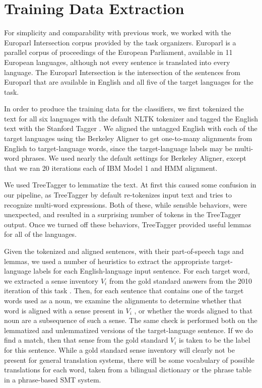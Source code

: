 \documentclass[11pt,letterpaper]{article}
\begin{document}
\section{Training Data Extraction}
\label{extraction}
For simplicity and comparability with previous work, we worked with the
Europarl Intersection corpus provided by the task organizers. Europarl
\cite{europarl} is a parallel corpus of proceedings of the European Parliament,
available in 11 European languages, although not every sentence is translated
into every language. The Europarl Intersection is the intersection of the
sentences from Europarl that are available in English and all five of the
target languages for the task.

In order to produce the training data for the classifiers, we first tokenized
the text for all six languages with the default NLTK tokenizer and tagged the
English text with the Stanford Tagger
\cite{Toutanova03feature-richpart-of-speech}. We aligned the untagged English
with each of the target languages using the Berkeley Aligner
\cite{denero-klein:2007:ACLMain} to get one-to-many alignments from English to
target-language words, since the target-language labels may be multi-word
phrases. We used nearly the default settings for Berkeley Aligner, except that
we ran 20 iterations each of IBM Model 1 and HMM alignment.

We used TreeTagger \cite{Schmid95improvementsin} to lemmatize the text. At
first this caused some confusion in our pipeline, as TreeTagger by default
re-tokenizes input text and tries to recognize multi-word expressions. Both of
these, while sensible behaviors, were unexpected, and resulted in a surprising 
number of tokens in the TreeTagger output. Once we turned off these behaviors,
TreeTagger provided useful lemmas for all of the languages.

Given the tokenized and aligned sentences, with their part-of-speech tags and
lemmas, we used a number of heuristics to extract the appropriate
target-language labels for each English-language input sentence.  For each
target word, we extracted a sense inventory $V_i$ from the gold standard
answers from the 2010 iteration of this task \cite{lefever-hoste:2009:SEW}.
Then, for each sentence that contains one of the target words used as a noun,
we examine the alignments to determine whether that word is aligned with a
sense present in $V_i$ , or whether the words aligned to that noun are a
subsequence of such a sense. The same check is performed both on the lemmatized
and unlemmatized versions of the target-language sentence. If we do find a
match, then that sense from the gold standard $V_i$ is taken to be the label
for this sentence. While a gold standard sense inventory will clearly not be
present for general translation systems, there will be some vocabulary of
possible translations for each word, taken from a bilingual dictionary or the
phrase table in a phrase-based SMT system.
\end{document}
